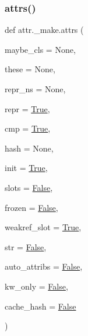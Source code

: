 \subsubsection{\texorpdfstring{attrs()}{attrs()}}
{\footnotesize\ttfamily def attr.\+\_\+make.\+attrs (\begin{DoxyParamCaption}\item[{}]{maybe\+\_\+cls = {\ttfamily None},  }\item[{}]{these = {\ttfamily None},  }\item[{}]{repr\+\_\+ns = {\ttfamily None},  }\item[{}]{repr = {\ttfamily \hyperlink{namespaceattr_1_1__make_a2574ed57c67459b7e6bcc4e40da338f3}{True}},  }\item[{}]{cmp = {\ttfamily \hyperlink{namespaceattr_1_1__make_a2574ed57c67459b7e6bcc4e40da338f3}{True}},  }\item[{}]{hash = {\ttfamily None},  }\item[{}]{init = {\ttfamily \hyperlink{namespaceattr_1_1__make_a2574ed57c67459b7e6bcc4e40da338f3}{True}},  }\item[{}]{slots = {\ttfamily \hyperlink{namespaceattr_1_1__make_a65fcd916433aa9a30f9711503366982e}{False}},  }\item[{}]{frozen = {\ttfamily \hyperlink{namespaceattr_1_1__make_a65fcd916433aa9a30f9711503366982e}{False}},  }\item[{}]{weakref\+\_\+slot = {\ttfamily \hyperlink{namespaceattr_1_1__make_a2574ed57c67459b7e6bcc4e40da338f3}{True}},  }\item[{}]{str = {\ttfamily \hyperlink{namespaceattr_1_1__make_a65fcd916433aa9a30f9711503366982e}{False}},  }\item[{}]{auto\+\_\+attribs = {\ttfamily \hyperlink{namespaceattr_1_1__make_a65fcd916433aa9a30f9711503366982e}{False}},  }\item[{}]{kw\+\_\+only = {\ttfamily \hyperlink{namespaceattr_1_1__make_a65fcd916433aa9a30f9711503366982e}{False}},  }\item[{}]{cache\+\_\+hash = {\ttfamily \hyperlink{namespaceattr_1_1__make_a65fcd916433aa9a30f9711503366982e}{False}} }\end{DoxyParamCaption})}

